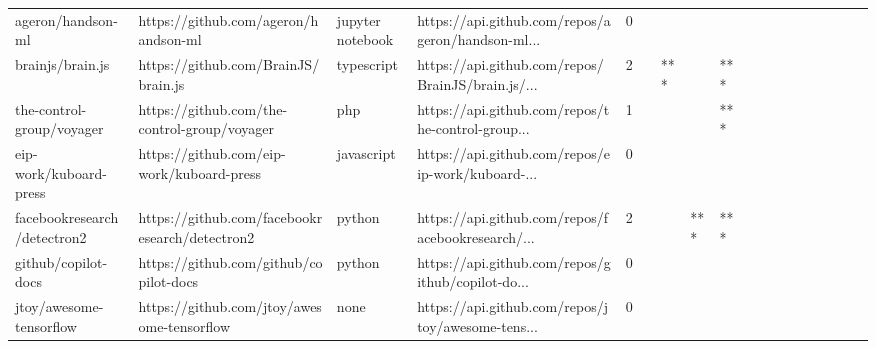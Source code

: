 \begin{tabular}{llllrlllllllllllll}
ageron/handson-ml                                  &               https://github.com/ageron/handson-ml &  jupyter notebook &  https://api.github.com/repos/ageron/handson-ml... &       0 &         &        &           &                &                 &        &           &           &          &          &       &              &          \\
brainjs/brain.js                                   &                https://github.com/BrainJS/brain.js &        typescript &  https://api.github.com/repos/BrainJS/brain.js/... &       2 &         &    *** &           &            *** &                 &        &           &           &          &          &       &              &          \\
the-control-group/voyager                          &       https://github.com/the-control-group/voyager &               php &  https://api.github.com/repos/the-control-group... &       1 &         &        &           &            *** &                 &        &           &           &          &          &       &              &          \\
eip-work/kuboard-press                             &          https://github.com/eip-work/kuboard-press &        javascript &  https://api.github.com/repos/eip-work/kuboard-... &       0 &         &        &           &                &                 &        &           &           &          &          &       &              &          \\
facebookresearch/detectron2                        &     https://github.com/facebookresearch/detectron2 &            python &  https://api.github.com/repos/facebookresearch/... &       2 &         &        &       *** &            *** &                 &        &           &           &          &          &       &              &          \\
github/copilot-docs                                &             https://github.com/github/copilot-docs &            python &  https://api.github.com/repos/github/copilot-do... &       0 &         &        &           &                &                 &        &           &           &          &          &       &              &          \\
jtoy/awesome-tensorflow                            &         https://github.com/jtoy/awesome-tensorflow &              none &  https://api.github.com/repos/jtoy/awesome-tens... &       0 &         &        &           &                &                 &        &           &           &          &          &       &              &          \\

\end{tabular}
